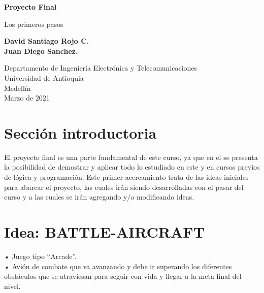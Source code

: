 \documentclass{article}
\begin{document}
\begin{titlepage}
    \begin{center}
        \vspace*{1cm}
            
        \Huge
        \textbf{Proyecto Final}
            
        \vspace{0.5cm}
        \LARGE
        Los primeros pasos
            
        \vspace{1.5cm}
            
        \textbf{David Santiago Rojo C.\\
        Juan Diego Sanchez.}
            
        \vfill
            
        \vspace{0.8cm}
            
        \Large
        Departamento de Ingeniería Electrónica y Telecomunicaciones\\
        Universidad de Antioquia\\
        Medellín\\
        Marzo de 2021
            
    \end{center}
\end{titlepage}

\tableofcontents
\newpage


\section{Sección introductoria}\label{intro}
El proyecto final es una parte fundamental de este curso, ya que en el se presenta la posibilidad de demostrar y aplicar todo lo estudiado en este y en cursos previos de lógica y programación. Este primer acercamiento trata de las ideas iniciales para abarcar el proyecto, las cuales irán siendo desarrolladas con el pasar del curso y a las cuales se irán agregando y/o modificando ideas.

\section{Idea: BATTLE-AIRCRAFT} \label{contenido}
•	Juego tipo “Arcade”.\cite{euronics} \\

•	Avión de combate que va avanzando y debe ir superando los diferentes obstáculos que se atraviesan para seguir con vida y llegar a la meta final del nivel.\\
\end{document}
